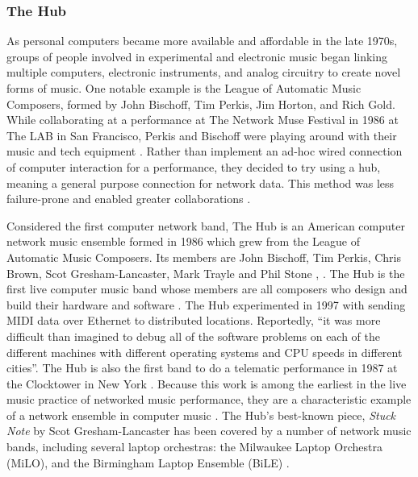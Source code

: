 \documentclass[letterpaper, 12pt]{article}
\begin{document}
\subsubsection{The Hub}


%
As personal computers became more available and affordable in the late 1970s, groups of people involved in experimental and electronic music began linking multiple computers, electronic instruments, and analog circuitry to create novel forms of music.
%
One notable example is the League of Automatic Music Composers, formed by John Bischoff, Tim Perkis, Jim Horton, and Rich Gold.
%
While collaborating at a performance at The Network Muse Festival in 1986 at The LAB in San Francisco, Perkis and Bischoff were playing around with their music and tech equipment \citep{brown2002indigenous}.
%
Rather than implement an ad-hoc wired connection of computer interaction for a performance, they decided to try using a hub, meaning a general purpose connection for network data.
%
This method was less failure-prone and enabled greater collaborations \citep{brown2002indigenous}.

%
Considered the first computer network band, The Hub is an American computer network music ensemble formed in 1986 which grew from the League of Automatic Music Composers.
%
Its members are John Bischoff, Tim Perkis, Chris Brown, Scot Gresham-Lancaster, Mark Trayle and Phil Stone \citep{bischoff2002indigenous}, \citep{brown2002indigenous}.
%
The Hub is the first live computer music band whose members are all composers who design and build their hardware and software \citep{gresham1999aesthetics}.
%
The Hub experimented in 1997 with sending MIDI data over Ethernet to distributed locations.
%
Reportedly, “it was more difficult than imagined to debug all of the software problems on each of the different machines with different operating systems and CPU speeds in different cities”.
%
The Hub is also the first band to do a telematic performance in 1987 at the Clocktower in New York \citep{brown2002indigenous}.
%
Because this work is among the earliest in the live music practice of networked music performance, they are a characteristic example of a network ensemble in computer music \citep{collins2010introduction}.
%
The Hub's best-known piece, \textit{Stuck Note} by Scot Gresham-Lancaster has been covered by a number of network music bands, including several laptop orchestras: the Milwaukee Laptop Orchestra (MiLO), and the Birmingham Laptop Ensemble (BiLE) \citep{surges2008networking} \citep{bilemusic2012all}.
\end{document}

